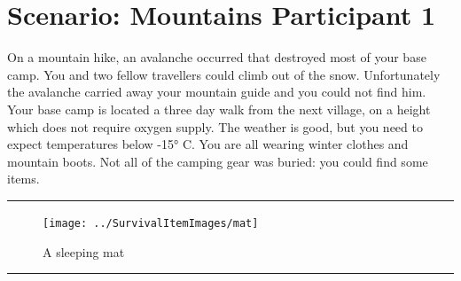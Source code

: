 \documentclass{article}
\begin{document}
    \section*{Scenario: \textmd{Mountains} \hfill Participant \textmd{1}}
    \Large On a mountain hike, an avalanche occurred that destroyed most of your base camp. You and two fellow travellers could climb out of the snow. Unfortunately the avalanche carried away your mountain guide and you could not find him. Your base camp is located a three day walk from the next village, on a height which does not require oxygen supply. The weather is good, but you need to expect temperatures below -15° C. You are all wearing winter clothes and mountain boots. Not all of the camping gear was buried: you could find some items.\clearpage
        \par\noindent\rule{\textwidth}{0.4pt}
    \begin{figure}[H]
        \centering
        \begin{minipage}{0.25\textwidth}
            \centering
            \texttt{[image: ../SurvivalItemImages/mat]}
        \end{minipage}\hfill
        \begin{minipage}{0.7\textwidth}
            \centering
            \Large A sleeping mat
        \end{minipage}
    \end{figure}
    \vspace{-0.8em}
    \noindent\rule{\textwidth}{0.4pt}
            
\end{document}
